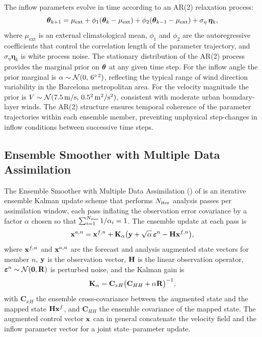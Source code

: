 The inflow parameters evolve in time according to an AR(2) relaxation process:
\begin{equation}
  \boldsymbol{\theta}_{k+1}
    = \mu_{\mathrm{ext}}
      + \phi_1(\boldsymbol{\theta}_k - \mu_{\mathrm{ext}})
      + \phi_2(\boldsymbol{\theta}_{k-1} - \mu_{\mathrm{ext}})
      + \sigma_\eta\,\boldsymbol{\eta}_k,
  \label{eq:ar2}
\end{equation}
where $\mu_{\mathrm{ext}}$ is an external climatological mean, $\phi_1$ and
$\phi_2$ are the autoregressive coefficients that control the correlation
length of the parameter trajectory, and $\sigma_\eta\boldsymbol{\eta}_k$ is
white process noise. The stationary distribution of the AR(2) process provides
the marginal prior on $\boldsymbol{\theta}$ at any given time step. For the
inflow angle the prior marginal is $\alpha \sim \mathcal{N}(0,\,6^{\circ\,2})$,
reflecting the typical range of wind direction variability in the Barcelona
metropolitan area. For the velocity magnitude the prior is
$V \sim \mathcal{N}(7.5\,\mathrm{m/s},\,0.5^2\,\mathrm{m}^2/\mathrm{s}^2)$,
consistent with moderate urban boundary-layer winds. The AR(2) structure ensures
temporal coherence of the parameter trajectories within each ensemble member,
preventing unphysical step-changes in inflow conditions between successive time
steps.

\subsection{Ensemble Smoother with Multiple Data Assimilation}
\label{sec:esmda_framework}

The Ensemble Smoother with Multiple Data Assimilation (\esmda{}) of
\cite{emerick2013} is an iterative ensemble Kalman update scheme that performs
$N_{\mathrm{iter}}$ analysis passes per assimilation window, each pass inflating
the observation error covariance by a factor $\alpha$ chosen so that
$\sum_{i=1}^{N_{\mathrm{iter}}} 1/\alpha_i = 1$. The ensemble update at each
pass is
\begin{equation}
  \mathbf{x}^{a,n}
    = \mathbf{x}^{f,n}
      + \mathbf{K}_\alpha
        \bigl(\mathbf{y} + \sqrt{\alpha}\,\boldsymbol{\varepsilon}^n
              - \mathbf{H}\mathbf{x}^{f,n}\bigr),
  \label{eq:esmda}
\end{equation}
where $\mathbf{x}^{f,n}$ and $\mathbf{x}^{a,n}$ are the forecast and analysis
augmented state vectors for member $n$, $\mathbf{y}$ is the observation vector,
$\mathbf{H}$ is the linear observation operator, $\boldsymbol{\varepsilon}^n
\sim \mathcal{N}(\mathbf{0},\mathbf{R})$ is perturbed noise, and the Kalman
gain is
\begin{equation}
  \mathbf{K}_\alpha
    = \mathbf{C}_{xH}
      \bigl(\mathbf{C}_{HH} + \alpha\mathbf{R}\bigr)^{-1},
  \label{eq:gain}
\end{equation}
with $\mathbf{C}_{xH}$ the ensemble cross-covariance between the augmented
state and the mapped state $\mathbf{H}\mathbf{x}^f$, and $\mathbf{C}_{HH}$
the ensemble covariance of the mapped state. The augmented control vector
$\mathbf{x}$ can in general concatenate the velocity field and the inflow
parameter vector for a joint state--parameter update.

